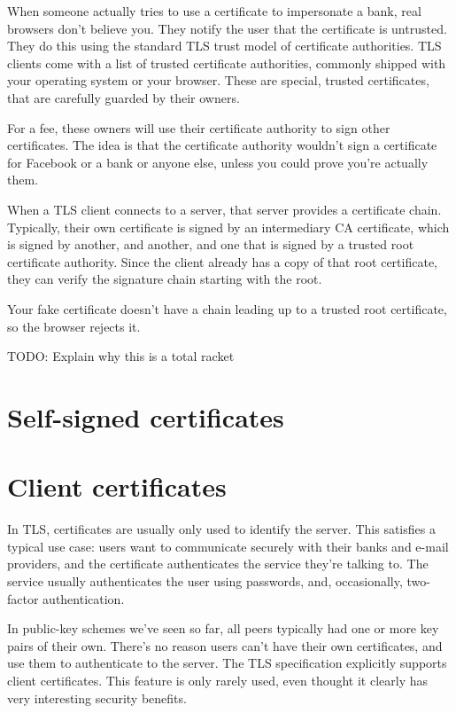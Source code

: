 \documentclass[11pt,ebook,table,dvipsnames]{memoir}
\begin{document}
When someone actually tries to use a certificate to impersonate a
bank, real browsers don't believe you. They notify the user that the
certificate is untrusted. They do this using the standard TLS trust
model of certificate authorities. TLS clients come with a list of
trusted certificate authorities, commonly shipped with your operating
system or your browser. These are special, trusted certificates, that
are carefully guarded by their owners.

For a fee, these owners will use their certificate authority to sign
other certificates. The idea is that the certificate authority
wouldn't sign a certificate for Facebook or a bank or anyone else,
unless you could prove you're actually them.

When a TLS client connects to a server, that server provides a
certificate chain. Typically, their own certificate is signed by an
intermediary CA certificate, which is signed by another, and another,
and one that is signed by a trusted root certificate authority. Since
the client already has a copy of that root certificate, they can
verify the signature chain starting with the root.

Your fake certificate doesn't have a chain leading up to a trusted
root certificate, so the browser rejects it.

TODO: Explain why this is a total racket
\section{Self-signed certificates}
\label{sec-3-1-4}
\section{Client certificates}
\label{sec-3-1-5}

In TLS, certificates are usually only used to identify the server.
This satisfies a typical use case: users want to communicate securely
with their banks and e-mail providers, and the certificate
authenticates the service they're talking to. The service usually
authenticates the user using passwords, and, occasionally, two-factor
authentication.

In public-key schemes we've seen so far, all peers typically had one
or more key pairs of their own. There's no reason users can't have
their own certificates, and use them to authenticate to the server.
The TLS specification explicitly supports client certificates. This
feature is only rarely used, even thought it clearly has very
interesting security benefits.
\end{document}
